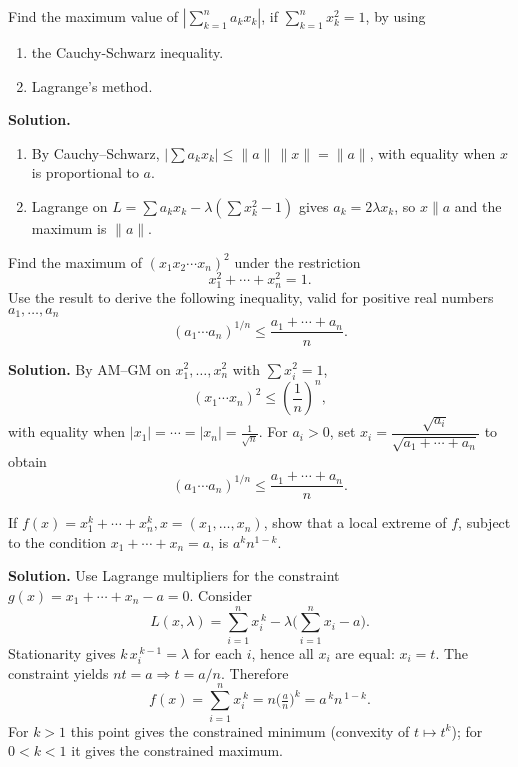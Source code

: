 \begin{problembox}
Find the maximum value of \(| \sum_{k=1}^n a_k x_k |\), if \(\sum_{k=1}^n x_k^2 = 1\), by using 
\begin{enumerate}[label=(\alph*)]
    \item the Cauchy-Schwarz inequality.
    \item Lagrange's method.
\end{enumerate}
\end{problembox}

\noindent\textbf{Solution.}
\begin{enumerate}[label=(\alph*)]
    \item By Cauchy--Schwarz, $\big|\sum a_k x_k\big|\le \|a\|\,\|x\|=\|a\|$, with equality when $x$ is proportional to $a$.
    \item Lagrange on $L=\sum a_k x_k-\lambda(\sum x_k^2-1)$ gives $a_k=2\lambda x_k$, so $x\parallel a$ and the maximum is $\|a\|$.
\end{enumerate}

\begin{problembox}
Find the maximum of \((x_1 x_2 \cdots x_n)^2\) under the restriction
\[ x_1^2 + \cdots + x_n^2 = 1. \]
Use the result to derive the following inequality, valid for positive real numbers \(a_1, \ldots, a_n\)
\[ (a_1 \cdots a_n)^{1/n} \leq \frac{a_1 + \cdots + a_n}{n}. \]
\end{problembox}

\noindent\textbf{Solution.}
By AM--GM on $x_1^2,\dots,x_n^2$ with $\sum x_i^2=1$,
\[(x_1\cdots x_n)^2\le \left(\frac{1}{n}\right)^n,\]
with equality when $|x_1|=\cdots=|x_n|=\tfrac{1}{\sqrt n}$. For $a_i>0$, set $x_i=\dfrac{\sqrt{a_i}}{\sqrt{a_1+\cdots+a_n}}$ to obtain
\[(a_1\cdots a_n)^{1/n}\le \frac{a_1+\cdots+a_n}{n}.
\]

\begin{problembox}
If \(f(x) = x_1^k + \cdots + x_n^k, x = (x_1, \ldots, x_n)\), show that a local extreme of \(f\), subject to the condition \(x_1 + \cdots + x_n = a\), is \(a^k n^{1-k}\).
\end{problembox}

\noindent\textbf{Solution.}
Use Lagrange multipliers for the constraint \(g(x)=x_1+\cdots+x_n-a=0\). Consider
\[L(x,\lambda)=\sum_{i=1}^n x_i^{\,k}-\lambda\Big(\sum_{i=1}^n x_i-a\Big).\]
Stationarity gives \(k\,x_i^{\,k-1}=\lambda\) for each \(i\), hence all \(x_i\) are equal: \(x_i=t\). The constraint yields \(nt=a\Rightarrow t=a/n\). Therefore
\[f(x)=\sum_{i=1}^n x_i^{\,k}=n\Big(\tfrac{a}{n}\Big)^{\!k}=a^{\,k}n^{\,1-k}.
\]
For \(k>1\) this point gives the constrained minimum (convexity of \(t\mapsto t^{k}\)); for \(0<k<1\) it gives the constrained maximum.

